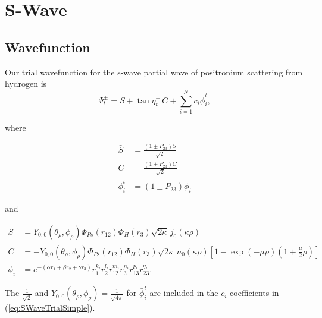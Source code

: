 \documentclass[Dissertation.tex]{subfiles}
\begin{document}
\chapter{S-Wave}
\label{chp:SWave}

\section{Wavefunction}
Our trial wavefunction for the s-wave partial wave of positronium scattering from hydrogen is
\begin{equation}
\Psi_t^\pm = \bar{S} + \tan \eta_t^\pm \, \bar{C} + \sum_{i=1}^N c_i \bar{\phi}_i^t ,
\label{eq:SWaveTrialSimple}
\end{equation}

\noindent where

\begin{subequations}\label{SCphiBarDef}
\begin{align}
\bar{S} &= \frac{\left( 1 \pm P_{23} \right) S}{\sqrt{2}} \label{SBarDef} \\
\bar{C} &= \frac{\left( 1 \pm P_{23} \right) C}{\sqrt{2}} \label{CBarDef} \\
\bar{\phi}_i^t &= \left( 1 \pm P_{23} \right) \phi_i \label{PhiBarDef}
\end{align}
\end{subequations}

\noindent and

\begin{subequations}\label{eq:SCPhiDef}
\begin{align}
S &= Y_{0,0}\!\left( \theta_\rho, \phi_\rho \right) \Phi_{Ps}\left(r_{12}\right) \Phi_H\left(r_3\right) \sqrt{2\kappa} \,j_0\!\left(\kappa\rho\right) \label{eq:SDef} \\
C &= -Y_{0,0}\!\left( \theta_\rho, \phi_\rho \right) \Phi_{Ps}\left(r_{12}\right) \Phi_H\left(r_3\right) \sqrt{2\kappa} \,n_0\!\left(\kappa\rho\right) \left[1 - \exp(-\mu \rho) (1+\frac{\mu}{2}\rho)\right] \label{eq:CDef} \\
\phi_i &= e^{-\left(\alpha r_1 + \beta r_2 + \gamma r_3 \right)} r_1^{k_i} r_2^{l_i} r_{12}^{m_i} r_3^{n_i} r_{13}^{p_i} r_{23}^{q_i}. \label{eq:PhiDef}
\end{align}
\end{subequations}

\noindent The $\frac{1}{\sqrt{2}}$ and $Y_{0,0}\left( \theta_\rho, \phi_\rho \right) = \frac{1}{\sqrt{4\pi}}$ for $\bar{\phi}_i^t$ are included in the $c_i$ coefficients in (\ref{eq:SWaveTrialSimple}).
\end{document}
